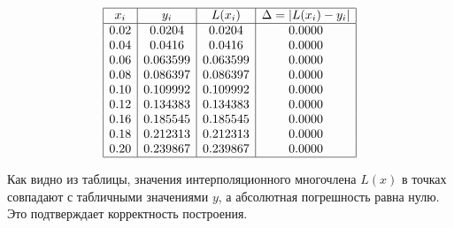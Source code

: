 \documentclass{article}
\begin{document}
\[
\begin{array}{|c|c|c|c|}
\hline
x_i & y_i & L(x_i) & \Delta = |L(x_i) - y_i| \\
\hline
0.02 & 0.0204   & 0.0204   & 0.0000 \\
0.04 & 0.0416   & 0.0416   & 0.0000 \\
0.06 & 0.063599 & 0.063599 & 0.0000 \\
0.08 & 0.086397 & 0.086397 & 0.0000 \\
0.10 & 0.109992 & 0.109992 & 0.0000 \\
0.12 & 0.134383 & 0.134383 & 0.0000 \\
0.16 & 0.185545 & 0.185545 & 0.0000 \\
0.18 & 0.212313 & 0.212313 & 0.0000 \\
0.20 & 0.239867 & 0.239867 & 0.0000 \\
\hline
\end{array}
\]

\noindent Как видно из таблицы, значения интерполяционного многочлена $L(x)$ в точках совпадают с табличными значениями $y$, а абсолютная погрешность равна нулю. Это подтверждает корректность построения.
\end{document}

